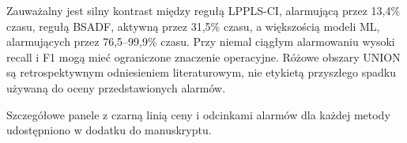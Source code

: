 Zauważalny jest silny kontrast między regułą LPPLS-CI, alarmującą
przez 13,4\% czasu, regułą BSADF, aktywną przez 31,5\% czasu,
a większością modeli ML, alarmujących przez 76,5--99,9\% czasu.
Przy niemal ciągłym alarmowaniu wysoki recall i F1 mogą mieć
ograniczone znaczenie operacyjne. Różowe obszary UNION są
retrospektywnym odniesieniem literaturowym, nie etykietą
przyszłego spadku używaną do oceny przedstawionych alarmów.

Szczegółowe panele z czarną linią ceny i odcinkami alarmów dla
każdej metody udostępniono w dodatku do manuskryptu.
